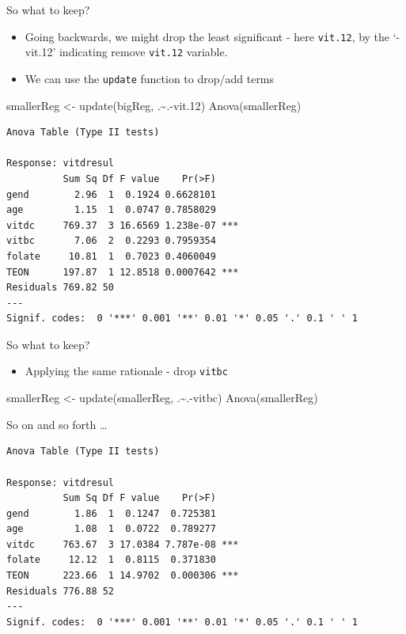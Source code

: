 \documentclass[
  oneside]{krantz}
\newenvironment{Shaded}{\begin{snugshade}}{\end{snugshade}}
\newcommand{\FloatTok}[1]{\textcolor[rgb]{0.00,0.00,0.81}{#1}}
\newcommand{\FunctionTok}[1]{\textcolor[rgb]{0.00,0.00,0.00}{#1}}
\newcommand{\NormalTok}[1]{#1}
\newcommand{\OtherTok}[1]{\textcolor[rgb]{0.56,0.35,0.01}{#1}}
\newcommand{\SpecialCharTok}[1]{\textcolor[rgb]{0.00,0.00,0.00}{#1}}
\providecommand{\tightlist}{%
  \setlength{\itemsep}{0pt}\setlength{\parskip}{0pt}}
\begin{document}
So what to keep?

\begin{itemize}
\tightlist
\item
  Going backwards, we might drop the least significant - here \texttt{vit.12}, by the `-vit.12' indicating remove \texttt{vit.12} variable.
\item
  We can use the \texttt{update} function to drop/add terms
\end{itemize}

\begin{Shaded}
\begin{Highlighting}[]
\NormalTok{smallerReg }\OtherTok{\textless{}{-}} \FunctionTok{update}\NormalTok{(bigReg, .}\SpecialCharTok{\textasciitilde{}}\NormalTok{.}\SpecialCharTok{{-}}\NormalTok{vit}\FloatTok{.12}\NormalTok{)}
\FunctionTok{Anova}\NormalTok{(smallerReg)}
\end{Highlighting}
\end{Shaded}

\begin{verbatim}
Anova Table (Type II tests)

Response: vitdresul
          Sum Sq Df F value    Pr(>F)    
gend        2.96  1  0.1924 0.6628101    
age         1.15  1  0.0747 0.7858029    
vitdc     769.37  3 16.6569 1.238e-07 ***
vitbc       7.06  2  0.2293 0.7959354    
folate     10.81  1  0.7023 0.4060049    
TEON      197.87  1 12.8518 0.0007642 ***
Residuals 769.82 50                      
---
Signif. codes:  0 '***' 0.001 '**' 0.01 '*' 0.05 '.' 0.1 ' ' 1
\end{verbatim}

So what to keep?

\begin{itemize}
\tightlist
\item
  Applying the same rationale - drop \texttt{vitbc}
\end{itemize}

\begin{Shaded}
\begin{Highlighting}[]
\NormalTok{smallerReg }\OtherTok{\textless{}{-}} \FunctionTok{update}\NormalTok{(smallerReg, .}\SpecialCharTok{\textasciitilde{}}\NormalTok{.}\SpecialCharTok{{-}}\NormalTok{vitbc)}
\FunctionTok{Anova}\NormalTok{(smallerReg)}
\end{Highlighting}
\end{Shaded}

So on and so forth \ldots{}

\begin{verbatim}
Anova Table (Type II tests)

Response: vitdresul
          Sum Sq Df F value    Pr(>F)    
gend        1.86  1  0.1247  0.725381    
age         1.08  1  0.0722  0.789277    
vitdc     763.67  3 17.0384 7.787e-08 ***
folate     12.12  1  0.8115  0.371830    
TEON      223.66  1 14.9702  0.000306 ***
Residuals 776.88 52                      
---
Signif. codes:  0 '***' 0.001 '**' 0.01 '*' 0.05 '.' 0.1 ' ' 1
\end{verbatim}
\end{document}
